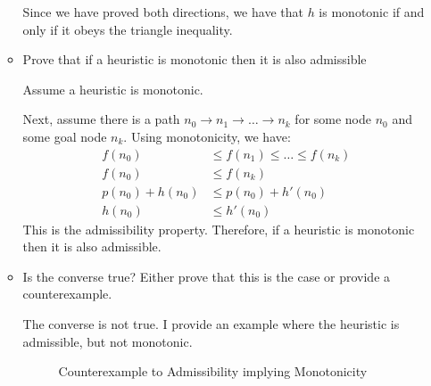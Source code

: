 \documentclass[10pt,\jkfside,a4paper]{article}
\begin{document}
\begin{enumerate}
\begin{itemize}
Since we have proved both directions, we have that $h$ is monotonic if and
only if it obeys the triangle inequality.

\item Prove that if a heuristic is monotonic then it is also admissible

Assume a heuristic is monotonic.

Next, assume there is a path $n_0 \to n_1 \to \dots \to n_k$ for some
node $n_0$ and some goal node $n_k$. Using monotonicity, we have:
\[
\begin{split}
f(n_0) &\le f(n_1) \le \dots \le f(n_k) \\
f(n_0) &\le f(n_k) \\
p(n_0) + h(n_0) &\le p(n_0) + h'(n_0) \\
h(n_0) &\le h'(n_0)
\end{split}
\]
This is the admissibility property. Therefore, if a heuristic is monotonic
then it is also admissible.

\item Is the converse true? Either prove that this is the case or provide a 
counterexample.

The converse is not true. I provide an example where the heuristic is
admissible, but not monotonic.

\begin{figure}[H]
\centering
{}
\caption{Counterexample to Admissibility implying Monotonicity}
\end{figure}

\end{itemize}

\setcounter{enumi}{6}


\end{enumerate}
\end{document}
